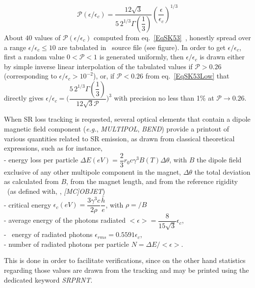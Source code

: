 \begin{equation}
\label{EqSK53Low}
\mathcal{P}(\epsilon/\epsilon_c) = \dfrac{12 \sqrt{3}}{5\, 2^{1/3} \Gamma(\dfrac{1}{3})}  
(\dfrac{\epsilon}{\epsilon_c})^{1/3}
\end{equation}
%
\noindent  About $40$ values of $\mathcal{P}(\epsilon/\epsilon_c)$ computed from eq.~\ref{EqSK53}~\cite{VOKostroun}, 
honestly spread  over a range $\epsilon/\epsilon_c \leq 10$ are  tabulated 
in \zgoubi\ source file (see figure). In 
order to get $\epsilon/\epsilon_c$, first a random value $0<\mathcal{P}<1$ is generated uniformly, 
then  $\epsilon/\epsilon_c$ is drawn either  by simple inverse linear interpolation 
 of the tabulated values if $\mathcal{P}>0.26$ (corresponding to 
$\epsilon/\epsilon_c>10^{-2}$), 
or, if $\mathcal{P}<0.26$ from eq.~\ref{EqSK53Low} that directly gives 
 $\epsilon/\epsilon_c= \bigl( \dfrac{5 \, 2^{1/3} \Gamma(\dfrac{1}{3})}{12 \sqrt{3} \mathcal{P}}\bigr)^3$ 
 with precision no less than 1$\%$ at  $\mathcal{P}\rightarrow 0.26$. 

\bigskip


\noindent When SR loss tracking is requested, several optical elements that contain a dipole 
magnetic field component (\emph{e.g.}, \textsl{MULTIPOL}, \textsl{BEND}) provide a printout of various 
 quantities related to SR emission, as drawn from classical theoretical 
expressions, such as for instance, \\
- energy loss per particle $\Delta E(eV)= \dfrac{2}{3}r_0 c \gamma^3 B(T) \Delta \theta$,   with $B$ 
the dipole field  exclusive of any other multipole component 
in the magnet, $\Delta \theta$  the total deviation as calculated from $B$, from the 
magnet length, and from the reference rigidity \BORO\ (as defined with, \eg, \textsl{[MC]OBJET}) \\
-  critical energy $\epsilon_c(eV)=\dfrac{3 \gamma^3 c}{2 \rho} \dfrac{\bar{h}}{e}$, with 
$\rho =$\BORO$/B$ \\
- average energy of the photons radiated $<\epsilon> = \dfrac{8}{15 \sqrt{3}} \epsilon_c$, \\ 
- \rms\ energy of radiated photons $\epsilon_{rms} = 0.5591 \epsilon_c$, \\
- number of radiated photons per particle  $N = \Delta E /<\epsilon>$.  

\noindent This is done in order to facilitate verifications, since on the other hand statistics 
regarding those values are drawn from the tracking and may be printed using  the dedicated 
keyword \textsl{SRPRNT}. 



